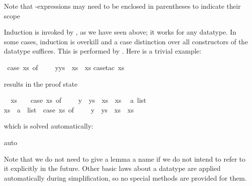 \begin{isabellebody}
\begin{isamarkuptext}
Note that -expressions may need to be enclosed in parentheses to
indicate their scope%
\end{isamarkuptext}%
\isamarkuptrue%
%
\isamarkuptrue%
%
\begin{isamarkuptext}%
\label{sec:struct-ind-case}
%
Induction is invoked by , as we have seen above; 
it works for any datatype.  In some cases, induction is overkill and a case
distinction over all constructors of the datatype suffices.  This is performed
by .  Here is a trivial example:%
\end{isamarkuptext}%
\isamarkuptrue%
\ {\isachardoublequote}{\isacharparenleft}case\ xs\ of\ {\isacharbrackleft}{\isacharbrackright}\ {\isasymRightarrow}\ {\isacharbrackleft}{\isacharbrackright}\ {\isacharbar}\ y{\isacharhash}ys\ {\isasymRightarrow}\ xs{\isacharparenright}\ {\isacharequal}\ xs{\isachardoublequote}\isanewline
\isamarkupfalse%
case{\isacharunderscore}tac\ xs{\isacharparenright}\isamarkupfalse%
%
\begin{isamarkuptxt}%
\noindent
results in the proof state
\begin{isabelle}%
\ {}{\isachardot}\ xs\ {\isacharequal}\ {\isacharbrackleft}{\isacharbrackright}\ {\isasymLongrightarrow}\ {\isacharparenleft}case\ xs\ of\ {\isacharbrackleft}{\isacharbrackright}\ {\isasymRightarrow}\ {\isacharbrackleft}{\isacharbrackright}\ {\isacharbar}\ y\ {\isacharhash}\ ys\ {\isasymRightarrow}\ xs{\isacharparenright}\ {\isacharequal}\ xs\isanewline
\ {}{\isachardot}\ {\isasymAnd}a\ list{\isachardot}\isanewline
{}xs\ {\isacharequal}\ a\ {\isacharhash}\ list\ {\isasymLongrightarrow}\ {\isacharparenleft}case\ xs\ of\ {\isacharbrackleft}{\isacharbrackright}\ {\isasymRightarrow}\ {\isacharbrackleft}{\isacharbrackright}\ {\isacharbar}\ y\ {\isacharhash}\ ys\ {\isasymRightarrow}\ xs{\isacharparenright}\ {\isacharequal}\ xs%
\end{isabelle}
which is solved automatically:%
\end{isamarkuptxt}%
\isamarkuptrue%
auto{\isacharparenright}\isamarkupfalse%
\isamarkupfalse%
%
\begin{isamarkuptext}%
Note that we do not need to give a lemma a name if we do not intend to refer
to it explicitly in the future.
Other basic laws about a datatype are applied automatically during
simplification, so no special methods are provided for them.


\end{isamarkuptext}
\end{isabellebody}
